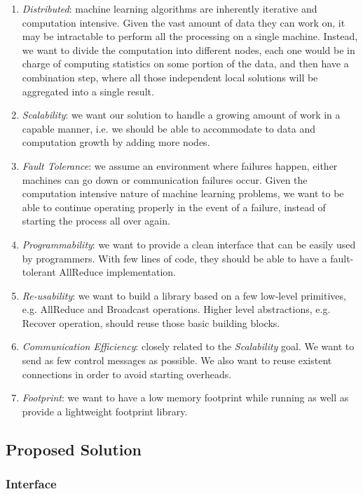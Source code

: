 \documentclass[10pt,twocolumn]{article}
\newcommand{\todo}[1]{\noindent{\textcolor{red}{\{{\bf TODO:}  #1\}}}}
\begin{document}
\begin{enumerate}
  \item \emph{Distributed}: machine learning algorithms are inherently iterative and computation intensive. Given the vast amount of data they can work on, it may be intractable to perform all the processing on a single machine. Instead, we want to divide the computation into different nodes, each one would be in charge of computing statistics on some portion of the data, and then have a combination step, where all those independent local solutions will be aggregated into a single result.
  \item \emph{Scalability}: we want our solution to handle a growing amount of work in a capable manner, i.e. we should be able to accommodate to data and computation growth by adding more nodes.
  \item \emph{Fault Tolerance}: we assume an environment where failures happen, either machines can go down or communication failures occur. Given the computation intensive nature of machine learning problems, we want to be able to continue operating properly in the event of a failure, instead of starting the process all over again.
  \item \emph{Programmability}: we want to provide a clean interface that can be easily used by programmers. With few lines of code, they should be able to have a fault-tolerant AllReduce implementation.
  \item \emph{Re-usability}: we want to build a library based on a few low-level primitives, e.g. AllReduce and Broadcast operations. Higher level abstractions, e.g. Recover operation, should reuse those basic building blocks.
  \item \emph{Communication Efficiency}: closely related to the \emph{Scalability} goal. We want to send as few control messages as possible. We also want to reuse existent connections in order to avoid starting overheads.
  \item \emph{Footprint}: we want to have a low memory footprint while running as well as provide a lightweight footprint library.
\end{enumerate}

\subsection{Proposed Solution}

\todo{what we did}


\subsubsection{Interface}
\end{document}
